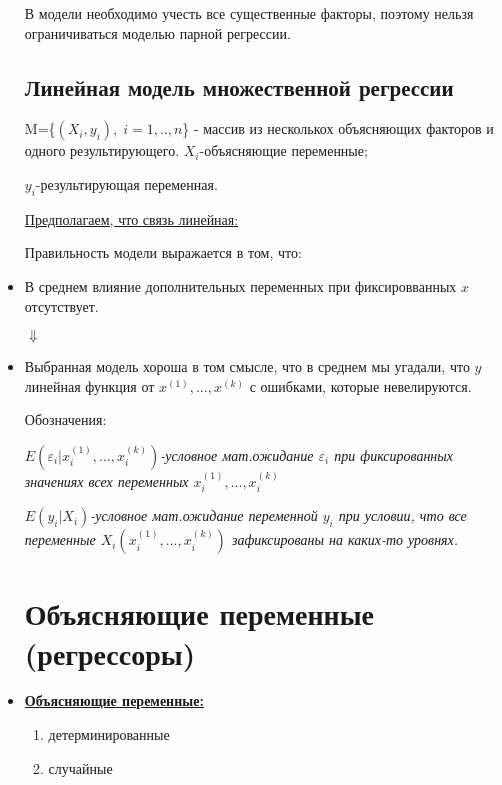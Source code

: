 \documentclass{article}
\begin{document}
\begin{itemize}
В модели необходимо учесть все существенные факторы, поэтому нельзя ограничиваться моделью парной регрессии.

\subsection{Линейная модель множественной регрессии}
M=\{$(X_i, y_i), \;  i=1,..,n$\} - массив из несколькох объясняющих факторов и одного результирующего.
$X_i$-объясняющие переменные;

$y_i$-результирующая переменная.

\underline{Предполагаем, что связь линейная:}

Правильность модели выражается в том, что:

\item В среднем влияние дополнительных переменных при фиксировванных $x$ отсутствует.


\qquad\qquad $\Downarrow$


\item Выбранная модель хороша в том смысле, что в среднем мы угадали, что $y$ линейная функция от $x^{(1)},\ldots,x^{(k)}$ с ошибками, которые невелируются.


\vspace{3ex}
Обозначения:

\textit{$E(\varepsilon_i|x_i^{(1)},...,x_i^{(k)})$-условное мат.ожидание $\varepsilon_i$ при фиксированных значениях всех переменных $x_i^{(1)},...,x_i^{(k)}$}

\textit{$E(y_i|X_i)$-условное мат.ожидание переменной $y_i$ при условии, что все переменные $X_i (x_i^{(1)},...,x_i^{(k)})$ зафиксированы на каких-то уровнях.}

\section{Объясняющие переменные (регрессоры)}
\item\underline{\textbf{Объясняющие переменные:}}
\begin{enumerate}
\item детерминированные 
\item случайные
\end{enumerate}


\end{itemize}
\end{document}
